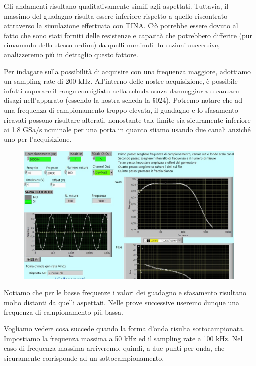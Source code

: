 Gli andamenti risultano qualitativamente simili agli aspettati. Tuttavia, il massimo del guadagno risulta essere inferiore rispetto a quello riscontrato attraverso la simulazione effettuata con TINA. Ciò potrebbe essere dovuto al fatto che sono stati forniti delle resistenze e capacità che potrebbero differire (pur rimanendo dello stesso ordine) da quelli nominali. In sezioni successive, analizzeremo più in dettaglio questo fattore.

Per indagare sulla possibilità di acquisire con una frequenza maggiore, adottiamo un sampling rate di 200 kHz. All'interno delle nostre acquisizione, è possibile infatti superare il range consigliato nella scheda senza danneggiarla o causare disagi nell'apparato (essendo la nostra scheda la 6024). Potremo notare che ad una frequenza di campionamento troppo elevata, il guadagno e lo sfasamento ricavati possono risultare alterati, nonostante tale limite sia sicuramente  inferiore ai 1.8 GSa/s nominale per una porta in quanto stiamo usando due canali anziché uno per l'acquisizione.


\begin{figure}[H]
\caption{}
    \includegraphics[width=12cm]{settimana_2/immagini/rccr_3.jpg}
    \centering
\end{figure}

Notiamo che per le basse frequenze i valori dei guadagno e sfasamento risultano molto distanti da quelli aspettati. Nelle prove successive useremo dunque una frequenza di campionamento più bassa.

Vogliamo vedere cosa succede quando la forma d'onda risulta sottocampionata. Impostiamo la frequenza massima a 50 kHz ed il sampling rate a 100 kHz. Nel caso di frequenza massima arriveremo, quindi, a due punti per onda, che sicuramente corrisponde ad un sottocampionamento. 

